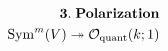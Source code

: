 \documentclass[preview]{standalone}
\begin{document}
\begin{align*}
\special{dvisvgm:raw <g id='unique000'>}\mathbf{3.\;Polarization}\\\operatorname{Sym}^m(V)\twoheadrightarrow\mathcal{O}_{\text{quant}}(k;1)\special{dvisvgm:raw </g>}
\end{align*}
\end{document}
